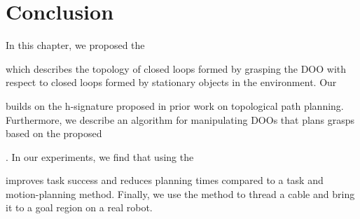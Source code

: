 \section{Conclusion}

In this chapter, we proposed the \signature{} which describes the topology of closed loops formed by grasping the DOO with respect to closed loops formed by stationary objects in the environment. Our \signature{} builds on the h-signature proposed in prior work on topological path planning. Furthermore, we describe an algorithm for manipulating DOOs that plans grasps based on the proposed \signature{}. In our experiments, we find that using the \signature{} improves task success and reduces planning times compared to a task and motion-planning method. Finally, we use the method to thread a cable and bring it to a goal region on a real robot.